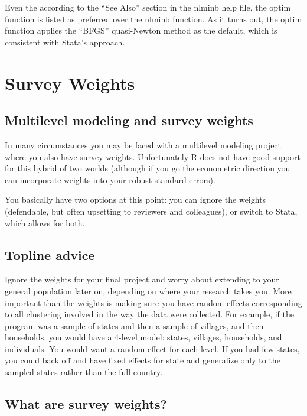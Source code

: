 \documentclass[
  letterpaper,
  DIV=11,
  numbers=noendperiod]{scrreprt}
\begin{document}
Even the according to the ``See Also'' section in the nlminb help file,
the optim function is listed as preferred over the nlminb function. As
it turns out, the optim function applies the ``BFGS'' quasi-Newton
method as the default, which is consistent with Stata's approach.

\chapter{Survey Weights}\label{survey-weights}

\section{Multilevel modeling and survey
weights}\label{multilevel-modeling-and-survey-weights}

In many circumstances you may be faced with a multilevel modeling
project where you also have survey weights. Unfortunately R does not
have good support for this hybrid of two worlds (although if you go the
econometric direction you can incorporate weights into your robust
standard errors).

You basically have two options at this point: you can ignore the weights
(defendable, but often upsetting to reviewers and colleagues), or switch
to Stata, which allows for both.

\section{Topline advice}\label{topline-advice}

Ignore the weights for your final project and worry about extending to
your general population later on, depending on where your research takes
you. More important than the weights is making sure you have random
effects corresponding to all clustering involved in the way the data
were collected. For example, if the program was a sample of states and
then a sample of villages, and then households, you would have a 4-level
model: states, villages, households, and individuals. You would want a
random effect for each level. If you had few states, you could back off
and have fixed effects for state and generalize only to the sampled
states rather than the full country.

\section{What are survey weights?}\label{what-are-survey-weights}
\end{document}
